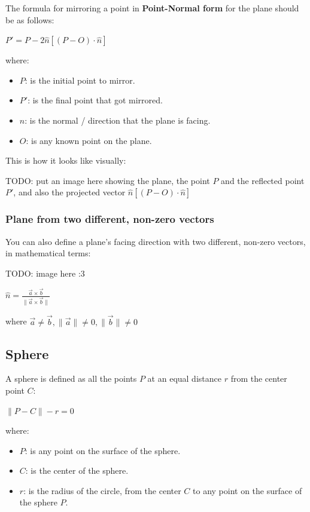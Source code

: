 \sgap
The formula for mirroring a point in \textbf{Point-Normal form} for the plane should be as follows:
\begin{center}
    $P' = P - 2 \hat{n} [(P - O) \cdot \hat{n}]$
\end{center}

where:
\begin{itemize}
    \item $P$: is the initial point to mirror.
    \item $P'$: is the final point that got mirrored.
    \item $\hat{n}$: is the normal / direction that the plane is facing.
    \item $O$: is any known point on the plane.
\end{itemize}

This is how it looks like visually:

TODO: put an image here showing the plane, the point $P$ and the reflected point $P'$, and also the projected vector
$\hat{n}[(P - O) \cdot \hat{n}]$





\subsubsection{Plane from two different, non-zero vectors}
You can also define a plane's facing direction with two different, non-zero vectors, in mathematical terms:

TODO: image here :3

\begin{center}
    $\hat{n} = \frac{\vec{a} \times \vec{b}}{\|\vec{a} \times \vec{b}\|}$
\end{center}

where $\vec{a} \neq \vec{b}, \|\vec{a}\| \neq 0, \|\vec{b}\| \neq 0$




\subsection{Sphere}
A sphere is defined as all the points $P$ at an equal distance $r$
from the center point $C$:

\begin{center}
    $\|P-C\|-r=0$
\end{center}

where:
\begin{itemize}
    \item $P$: is any point on the surface of the sphere.
    \item $C$: is the center of the sphere.
    \item $r$: is the radius of the circle, from the center $C$ to any point on the
        surface of the sphere $P$.
\end{itemize}

